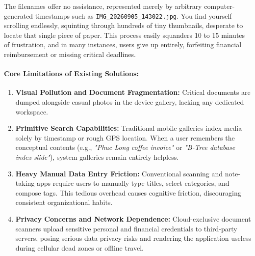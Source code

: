 The filenames offer no assistance, represented merely by arbitrary computer-generated timestamps such as \texttt{IMG\_20260905\_143022.jpg}. You find yourself scrolling endlessly, squinting through hundreds of tiny thumbnails, desperate to locate that single piece of paper. This process easily squanders 10 to 15 minutes of frustration, and in many instances, users give up entirely, forfeiting financial reimbursement or missing critical deadlines.

\paragraph{Core Limitations of Existing Solutions:}
\begin{enumerate}
    \item \textbf{Visual Pollution and Document Fragmentation:} Critical documents are dumped alongside casual photos in the device gallery, lacking any dedicated workspace.
    \item \textbf{Primitive Search Capabilities:} Traditional mobile galleries index media solely by timestamp or rough GPS location. When a user remembers the conceptual contents (e.g., \textit{"Phuc Long coffee invoice"} or \textit{"B-Tree database index slide"}), system galleries remain entirely helpless.
    \item \textbf{Heavy Manual Data Entry Friction:} Conventional scanning and note-taking apps require users to manually type titles, select categories, and compose tags. This tedious overhead causes cognitive friction, discouraging consistent organizational habits.
    \item \textbf{Privacy Concerns and Network Dependence:} Cloud-exclusive document scanners upload sensitive personal and financial credentials to third-party servers, posing serious data privacy risks and rendering the application useless during cellular dead zones or offline travel.
\end{enumerate}

